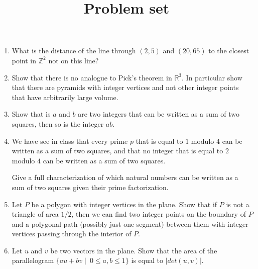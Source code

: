 \documentclass[12pt]{article}
\begin{document}
\title{\bf Problem set}
\maketitle

\begin{enumerate}

\item What is the distance of the line
through $(2,5)$ and $(20, 65)$ to the closest
point in $\mathbb{Z}^2$ not on this line?

\item Show that there is no analogue to Pick's theorem in $\mathbb{R}^3$. In particular show that there are pyramids with integer vertices and not other integer points that have arbitrarily large volume.

\item Show that is $a$ and $b$ are two integers that can be written as a sum of two squares, then so is the integer $ab$.

\item We have see in class that every prime $p$ that is equal to $1$ modulo $4$ can be written as a sum of two squares, and that no integer that is equal to $2$ modulo $4$ can be written as a sum of two squares.

Give a full characterization of which natural numbers can be written as a sum of two squares given their prime factorization.

\item Let $P$ be a polygon with integer vertices in the plane. Show that if $P$ is not a triangle of area $1/2$, then we can find two integer points on the boundary of $P$ and a polygonal path (possibly just one segment) between them with integer vertices passing through the interior of $P$.

\item Let $u$ and $v$ be two vectors in the plane. Show that the area of the parallelogram
$\{au+bv \mid ~0 \leq a, b \leq 1\}$ is equal to $|det(u,v)|$.


\end{enumerate}


\end{document}
